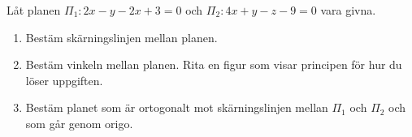 \documentclass[11pt]{article}
\begin{document}
Låt planen $\Pi_1 : 2x - y - 2x + 3 = 0$ och $\Pi_2 : 4x + y - z - 9 = 0$ vara givna.
\begin{enumerate}[label=(\alph*)]
    \item Bestäm skärningslinjen mellan planen.
    \item Bestäm vinkeln mellan planen. Rita en figur som visar principen för hur du löser uppgiften.
    \item Bestäm planet som är ortogonalt mot skärningslinjen mellan $\Pi_1$ och $\Pi_2$ och som går genom origo.
\end{enumerate}
\end{document}
